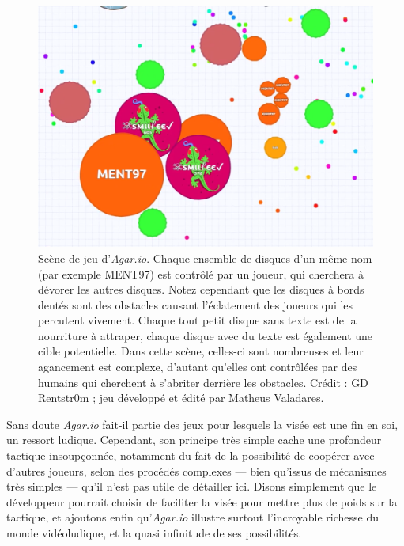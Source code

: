 	\begin{figure}[htb]
		\centering
		\includegraphics[width=\textwidth]{figures/ch1/agario}
		\caption[\emph{Agar.io}]{Scène de jeu d'\emph{Agar.io}. Chaque ensemble de disques d'un même nom (par exemple MENT97) est contrôlé par un joueur, qui cherchera à dévorer les autres disques. Notez cependant que les disques à bords dentés sont des obstacles causant l'éclatement des joueurs qui les percutent vivement. Chaque tout petit disque sans texte est de la nourriture à attraper, chaque disque avec du texte est également une cible potentielle. Dans cette scène, celles-ci sont nombreuses et leur agancement est complexe, d'autant qu'elles ont contrôlées par des humains qui cherchent à s'abriter derrière les obstacles. Crédit : GD Rentstr0m\footnotemark{} ; jeu développé et édité par Matheus Valadares.}
		\label{fig:agario}
	\end{figure}
	
	
	Sans doute \emph{Agar.io} fait-il partie des jeux pour lesquels la visée est une fin en soi, un ressort ludique. Cependant, son principe très simple cache une profondeur tactique insoupçonnée, notamment du fait de la possibilité de coopérer avec d'autres joueurs, selon des procédés complexes --- bien qu'issus de mécanismes très simples --- qu'il n'est pas utile de détailler ici. Disons simplement que le développeur pourrait choisir de faciliter la visée pour mettre plus de poids sur la tactique, et ajoutons enfin qu'\emph{Agar.io} illustre surtout l'incroyable richesse du monde vidéoludique, et la quasi infinitude de ses possibilités.


